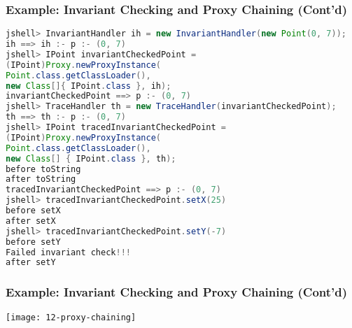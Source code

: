 \subsubsection{Example: Invariant Checking and Proxy Chaining (Cont'd)}

\begin{lstlisting}[language=Java]
jshell> InvariantHandler ih = new InvariantHandler(new Point(0, 7));
ih ==> ih :- p :- (0, 7)
jshell> IPoint invariantCheckedPoint =
(IPoint)Proxy.newProxyInstance(
Point.class.getClassLoader(),
new Class[]{ IPoint.class }, ih);
invariantCheckedPoint ==> p :- (0, 7)
jshell> TraceHandler th = new TraceHandler(invariantCheckedPoint);
th ==> th :- p :- (0, 7)
jshell> IPoint tracedInvariantCheckedPoint =
(IPoint)Proxy.newProxyInstance(
Point.class.getClassLoader(),
new Class[] { IPoint.class }, th);
before toString
after toString
tracedInvariantCheckedPoint ==> p :- (0, 7)
jshell> tracedInvariantCheckedPoint.setX(25)
before setX
after setX
jshell> tracedInvariantCheckedPoint.setY(-7)
before setY
Failed invariant check!!!
after setY
\end{lstlisting}

\subsubsection{Example: Invariant Checking and Proxy Chaining (Cont'd)}

\begin{center}
\texttt{[image: 12-proxy-chaining]}
\end{center}


